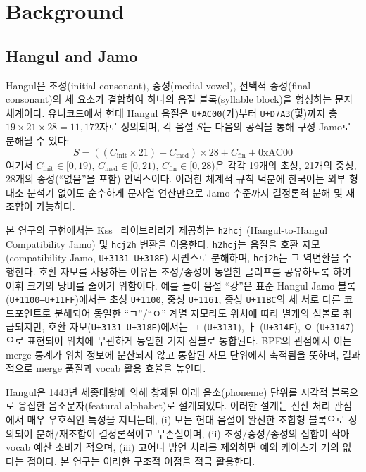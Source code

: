 \documentclass[sigconf,nonacm]{acmart}
\begin{document}
\section{Background}
\label{sec:background}

\subsection{Hangul and Jamo}

Hangul은 초성(initial consonant), 중성(medial vowel), 선택적 종성(final consonant)의 세 요소가 결합하여
하나의 음절 블록(syllable block)을 형성하는 문자 체계이다. 유니코드에서 현대 Hangul 음절은
\texttt{U+AC00}(가)부터 \texttt{U+D7A3}(힣)까지 총 $19 \times 21 \times 28 = 11{,}172$자로
정의되며, 각 음절 $S$는 다음의 공식을 통해 구성 Jamo로 분해될 수 있다:
\[
S = ((C_{\text{init}} \times 21) + C_{\text{med}}) \times 28 + C_{\text{fin}} + \text{0xAC00}
\]
여기서 $C_{\text{init}} \in [0, 19)$, $C_{\text{med}} \in [0, 21)$, $C_{\text{fin}} \in [0, 28)$은
각각 19개의 초성, 21개의 중성, 28개의 종성(``없음''을 포함) 인덱스이다.
이러한 체계적 규칙 덕분에 한국어는 외부 형태소 분석기 없이도 순수하게 문자열 연산만으로
Jamo 수준까지 결정론적 분해 및 재조합이 가능하다.

본 연구의 구현에서는 Kss~\cite{kss} 라이브러리가 제공하는 \texttt{h2hcj} (Hangul-to-Hangul
Compatibility Jamo) 및 \texttt{hcj2h} 변환을 이용한다. \texttt{h2hcj}는 음절을 호환 자모
(compatibility Jamo, \texttt{U+3131--U+318E}) 시퀀스로 분해하며, \texttt{hcj2h}는 그 역변환을
수행한다. 호환 자모를 사용하는 이유는 초성/종성이 동일한 글리프를 공유하도록 하여
어휘 크기의 낭비를 줄이기 위함이다. 예를 들어 음절 ``강''은 표준 Hangul Jamo 블록
(\texttt{U+1100--U+11FF})에서는 초성 \texttt{U+1100}, 중성 \texttt{U+1161}, 종성 \texttt{U+11BC}의
세 서로 다른 코드포인트로 분해되어 동일한 ``ㄱ''/``ㅇ'' 계열 자모라도 위치에 따라 별개의 심볼로
취급되지만, 호환 자모(\texttt{U+3131--U+318E})에서는 ㄱ (\texttt{U+3131}), ㅏ (\texttt{U+314F}),
ㅇ (\texttt{U+3147})으로 표현되어 위치에 무관하게 동일한 기저 심볼로 통합된다. BPE의 관점에서 이는 merge 통계가 위치 정보에 분산되지 않고 통합된
자모 단위에서 축적됨을 뜻하며, 결과적으로 merge 품질과 vocab 활용 효율을 높인다.

Hangul은 1443년 세종대왕에 의해 창제된 이래 음소(phoneme) 단위를 시각적 블록으로 응집한
음소문자(featural alphabet)로 설계되었다. 이러한 설계는 전산 처리 관점에서
매우 우호적인 특성을 지니는데, (i) 모든 현대 음절이 완전한 조합형 블록으로 정의되어 분해/재조합이
결정론적이고 무손실이며, (ii) 초성/중성/종성의 집합이 작아 vocab 예산 소비가 적으며,
(iii) 고어나 방언 처리를 제외하면 예외 케이스가 거의 없다는 점이다. 본 연구는 이러한
구조적 이점을 적극 활용한다.
\end{document}
